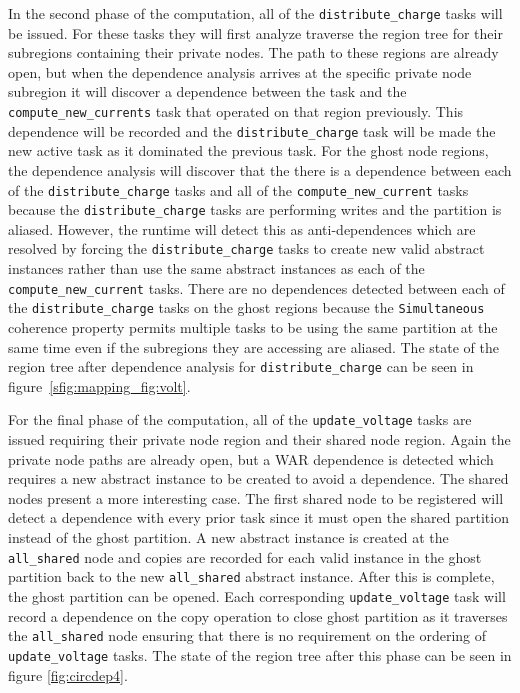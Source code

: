 In the second phase of the computation, all of the {\tt distribute\_charge} tasks
will be issued.  For these tasks they will first analyze traverse the region tree
for their subregions containing their private nodes.  The path to these regions are
already open, but when the dependence analysis arrives at the specific private node subregion it will
discover a dependence between the task and the {\tt compute\_new\_currents} task that operated
on that region previously.  This dependence will be recorded and the 
{\tt distribute\_charge} task will be made the new active task as it dominated the
previous task.  For the ghost node regions, the dependence analysis will discover that the
there is a dependence between each of the {\tt distribute\_charge} tasks and all of the
{\tt compute\_new\_current} tasks because the {\tt distribute\_charge} tasks are
performing writes and the partition is aliased.  However, the runtime will detect this as
anti-dependences which are resolved by forcing the {\tt distribute\_charge} tasks to
create new valid abstract instances rather than use the same abstract instances as
each of the {\tt compute\_new\_current} tasks.  There are no dependences detected
between each of the {\tt distribute\_charge} tasks on the ghost regions because
the {\tt Simultaneous} coherence property permits multiple tasks to be using the same
partition at the same time even if the subregions they are accessing are aliased.  The
state of the region tree after dependence analysis for {\tt distribute\_charge} can
be seen in figure~\ref{sfig:mapping_fig:volt}.

For the final phase of the computation, all of the {\tt update\_voltage} tasks
are issued requiring their private node region and their shared node region.  Again
the private node paths are already open, but a WAR dependence is detected which
requires a new abstract instance to be created to avoid a dependence.  The
shared nodes present a more interesting case.  The first shared node to be registered
will detect a dependence with every prior task since it must open the shared partition
instead of the ghost partition.  A new abstract instance is created at the 
{\tt all\_shared} node and copies are recorded for each valid instance in the ghost partition
back to the new {\tt all\_shared} abstract instance.  After this is complete, the
ghost partition can be opened.  Each corresponding {\tt update\_voltage} task will record
a dependence on the copy operation to close ghost partition as it traverses the {\tt all\_shared}
node ensuring that there is no requirement on the ordering of {\tt update\_voltage}
tasks.  The state of the region tree after this phase can be seen in figure \ref{fig:circdep4}.

